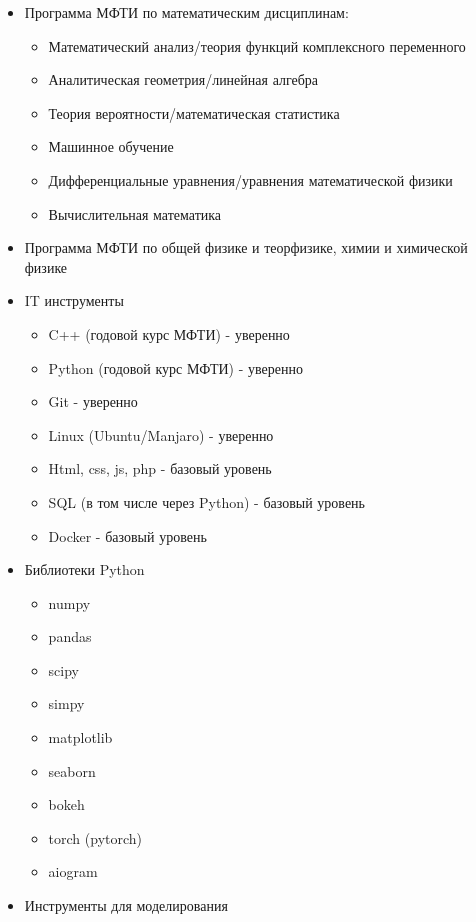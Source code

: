 \documentclass[a4paper, 12pt]{article}
\begin{document}
\begin{itemize}
    \item Программа МФТИ по математическим дисциплинам:
    \begin{itemize}
        \item Математический анализ/теория функций комплексного переменного
        \item Аналитическая геометрия/линейная алгебра
        \item Теория вероятности/математическая статистика
        \item Машинное обучение
        \item Дифференциальные уравнения/уравнения математической физики
        \item Вычислительная математика
    \end{itemize}
    \item Программа МФТИ по общей физике и теорфизике, химии и химической физике
    \item IT инструменты
    \begin{itemize}
        \item C++ (годовой курс МФТИ)        - уверенно
        \item Python (годовой курс МФТИ)     - уверенно
        \item Git                            - уверенно
        \item Linux (Ubuntu/Manjaro)         - уверенно
        \item Html, css, js, php             - базовый уровень 
        \item SQL (в том числе через Python) - базовый уровень
        \item Docker                         - базовый уровень
    \end{itemize}
    \item Библиотеки Python
    \begin{itemize}
        \item numpy
        \item pandas
        \item scipy
        \item simpy
        \item matplotlib
        \item seaborn 
        \item bokeh
        \item torch (pytorch)
        \item aiogram
    \end{itemize}
    \item Инструменты для моделирования

\end{itemize}
\end{document}
